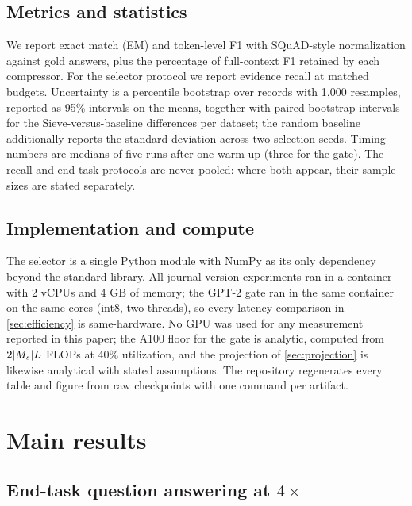 \documentclass[preprint,12pt]{elsarticle}
\DeclarePairedDelimiter\abs{\lvert}{\rvert}
\theoremstyle{remark}
\newcommand{\method}{Sieve}
\begin{document}
\subsection{Metrics and statistics}
We report exact match (EM) and token-level F1 with SQuAD-style
normalization \citep{yang2018hotpotqa} against gold answers, plus the
percentage of full-context F1 retained by each compressor. For the
selector protocol we report evidence recall at matched budgets.
Uncertainty is a percentile bootstrap over records with 1{,}000
resamples, reported as 95\% intervals on the means, together with
paired bootstrap intervals for the \method{}-versus-baseline
differences per dataset; the random baseline additionally reports the
standard deviation across two selection seeds. Timing numbers are
medians of five runs after one warm-up (three for the gate). The
recall and end-task protocols are never pooled: where both appear,
their sample sizes are stated separately.

\subsection{Implementation and compute}
The selector is a single Python module with NumPy as its only
dependency beyond the standard library. All journal-version
experiments ran in a container with 2 vCPUs and 4 GB of memory; the
GPT-2 gate ran in the same container on the same cores (int8, two
threads), so every latency comparison in \autoref{sec:efficiency} is
same-hardware. No GPU was used for any measurement reported in this
paper; the A100 floor for the gate is analytic, computed from
$2\abs{M_s} L$ FLOPs at 40\% utilization, and the projection of
\autoref{sec:projection} is likewise analytical with stated
assumptions. The repository regenerates every table and figure from
raw checkpoints with one command per artifact.

\section{Main results}
\label{sec:results}

\subsection{End-task question answering at \texorpdfstring{$4\times$}{4x}}
\label{sec:qa}
\end{document}
